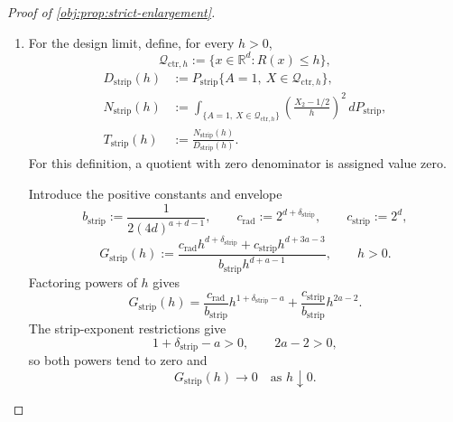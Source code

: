 \begin{proof}[Proof of \cref{obj:prop:strict-enlargement}]
\begin{enumerate}
\item For the design limit, define, for every \(h>0\),
\[
\mathcal Q_{\mathrm{ctr},h}
:=\{x\in\mathbb R^d:R(x)\le h\},
\]
\[
\begin{aligned}
D_{\mathrm{strip}}(h)
&:=P_{\mathrm{strip}}\{A=1,\ X\in\mathcal Q_{\mathrm{ctr},h}\},\\
N_{\mathrm{strip}}(h)
&:=\int_{\{A=1,\ X\in\mathcal Q_{\mathrm{ctr},h}\}}
\left(\frac{X_2-1/2}{h}\right)^2\,dP_{\mathrm{strip}},\\
T_{\mathrm{strip}}(h)
&:=\frac{N_{\mathrm{strip}}(h)}{D_{\mathrm{strip}}(h)}.
\end{aligned}
\]
For this definition, a quotient with zero denominator is assigned value zero.

Introduce the positive constants and envelope
\[
b_{\mathrm{strip}}
:=\frac{1}{2(4d)^{a+d-1}},
\qquad
c_{\mathrm{rad}}:=2^{d+\delta_{\mathrm{strip}}},
\qquad
c_{\mathrm{strip}}:=2^d,
\]
\[
G_{\mathrm{strip}}(h)
:=
\frac{
c_{\mathrm{rad}}h^{d+\delta_{\mathrm{strip}}}
+c_{\mathrm{strip}}h^{d+3a-3}
}{
b_{\mathrm{strip}}h^{d+a-1}
},
\qquad h>0.
\]
Factoring powers of \(h\) gives
\[
G_{\mathrm{strip}}(h)
=
\frac{c_{\mathrm{rad}}}{b_{\mathrm{strip}}}
h^{1+\delta_{\mathrm{strip}}-a}
+
\frac{c_{\mathrm{strip}}}{b_{\mathrm{strip}}}
h^{2a-2}.
\]
The strip-exponent restrictions give
\[
1+\delta_{\mathrm{strip}}-a>0,
\qquad
2a-2>0,
\]
so both powers tend to zero and
\[
G_{\mathrm{strip}}(h)\longrightarrow0
\quad\text{as }h\downarrow0.
\]


\end{enumerate}
\end{proof}
